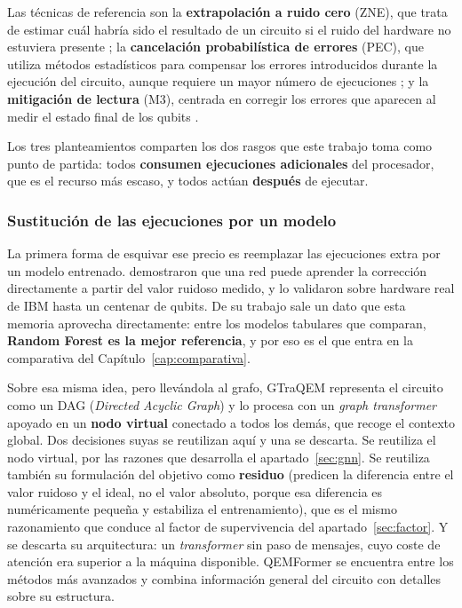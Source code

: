 Las técnicas de referencia son la \textbf{extrapolación a ruido cero} (ZNE), que trata de estimar cuál habría sido el resultado de un circuito si el ruido del hardware no estuviera presente \cite{temme2017error}; la \textbf{cancelación probabilística de errores} (PEC), que utiliza métodos estadísticos para compensar los errores introducidos durante la ejecución del circuito, aunque requiere un mayor número de ejecuciones \cite{cai2023quantum}; y la \textbf{mitigación de lectura} (M3), centrada en corregir los errores que aparecen al medir el estado final de los qubits \cite{nation2023suppressing}. 


Los tres planteamientos comparten los dos rasgos que este trabajo toma como punto de partida:
todos \textbf{consumen ejecuciones adicionales} del procesador, que es el recurso más escaso, y
todos actúan \textbf{después} de ejecutar.

\subsubsection*{Sustitución de las ejecuciones por un modelo}

La primera forma de esquivar ese precio es reemplazar las ejecuciones extra por un modelo
entrenado.  demostraron que una red puede aprender la corrección
directamente a partir del valor ruidoso medido, y lo validaron sobre hardware real de IBM hasta
un centenar de qubits. De su trabajo sale un dato que esta memoria aprovecha directamente:
entre los modelos tabulares que comparan, \textbf{Random Forest es la mejor referencia}, y por
eso es el que entra en la comparativa del Capítulo~\ref{cap:comparativa}.

Sobre esa misma idea, pero llevándola al grafo, GTraQEM \cite{bao2025gtraqem} representa el
circuito como un DAG (\textit{Directed Acyclic Graph}) y lo procesa con un \textit{graph
transformer} apoyado en un \textbf{nodo virtual} conectado a todos los demás, que recoge el
contexto global. Dos decisiones suyas se reutilizan aquí y una se descarta. Se reutiliza el nodo
virtual, por las razones que desarrolla el apartado~\ref{sec:gnn}. Se reutiliza también su
formulación del objetivo como \textbf{residuo} (predicen la diferencia entre el valor ruidoso y
el ideal, no el valor absoluto, porque esa diferencia es numéricamente pequeña y estabiliza el
entrenamiento), que es el mismo razonamiento que conduce al factor de supervivencia del
apartado~\ref{sec:factor}. Y se descarta su arquitectura: un \textit{transformer} sin paso de
mensajes, cuyo coste de atención era superior a la máquina disponible. QEMFormer \cite{bao2025qemformer} se encuentra entre los métodos más avanzados y combina información general del circuito con detalles sobre su estructura.

